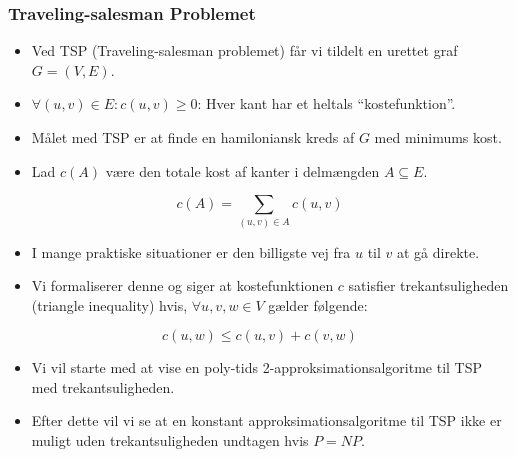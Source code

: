 \begin{frame}[allowframebreaks]
	\frametitle{Traveling-salesman Problemet}
	\begin{itemize}
		\item Ved TSP (Traveling-salesman problemet) får vi tildelt en urettet graf $G = (V,E)$.
		\item $\forall (u,v) \in E : c(u,v) \ge 0$: Hver kant har et heltals ``kostefunktion''.
		\item Målet med TSP er at finde en hamiloniansk kreds af $G$ med minimums kost.
		\item Lad $c(A)$ være den totale kost af kanter i delmængden $A \subseteq E$.
	\end{itemize}

	\begin{equation*}
		c(A) = \sum_{(u,v) \in A} c(u,v)
	\end{equation*}
	\begin{itemize}
		\item I mange praktiske situationer er den billigste vej fra $u$ til $v$ at gå direkte.
		\item Vi formaliserer denne og siger at kostefunktionen $c$ satisfier trekantsuligheden (triangle inequality) hvis, $\forall u,v, w \in V$ gælder følgende:
	\end{itemize}
	\begin{equation*}
		c(u,w) \le c(u,v) + c(v,w)
	\end{equation*}
	\begin{itemize}
		\item Vi vil starte med at vise en poly-tids 2-approksimationsalgoritme til TSP med trekantsuligheden.
		\item Efter dette vil vi se at en konstant approksimationsalgoritme til TSP ikke er muligt uden trekantsuligheden undtagen hvis $P = NP$.
	\end{itemize}
\end{frame}

